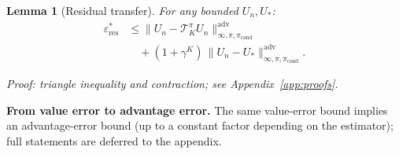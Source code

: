 \documentclass{article}
\theoremstyle{plain}
\newtheorem{lemma}[theorem]{Lemma}
\theoremstyle{definition}
\theoremstyle{remark}
\newcommand{\shortonly}[1]{#1}
\newcommand{\longonly}[1]{}
\newcommand{\shortonly}[1]{}
\newcommand{\longonly}[1]{#1}
\begin{document}
\begin{lemma}[Residual transfer]
\label{lem:residual_transfer}
For any bounded $U_n,U_*$:
\begin{equation}
\begin{split}
\varepsilon_{\mathrm{res}}^*
&\le
\|U_n - \mathcal{T}^\pi_K U_n\|_{\infty,\pi,\pi_{\mathrm{cand}}}^{\mathrm{adv}} \\
&\quad +
(1+\gamma^K)\,\|U_n-U_*\|_{\infty,\pi,\pi_{\mathrm{cand}}}^{\mathrm{adv}}.
\end{split}
\end{equation}
\end{lemma}
\emph{Proof: triangle inequality and contraction; see Appendix~\ref{app:proofs}.}
\longonly{This shows that if $U_n$ has small $K$-step residual and is close to $U_*$ on $\mathcal{R}_{\pi,\pi_{\mathrm{cand}}}^{\mathrm{adv}}$, then the architectural residual is also small.}

\shortonly{
\textbf{From value error to advantage error.}
The same value-error bound implies an advantage-error bound (up to a constant factor depending on the estimator); full statements are deferred to the appendix.}
\end{document}
